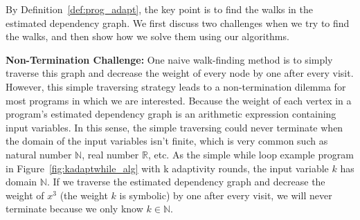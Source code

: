 By Definition~\ref{def:prog_adapt}, the key point is to find the walks in the estimated dependency graph. 
We first discuss two challenges when we try to find the walks,
and then show how we solve them using our algorithms.

\textbf{Non-Termination Challenge:}
One naive walk-finding method is to simply traverse this graph and decrease the weight of every node by one after every visit. However, this simple 
traversing strategy leads to a non-termination dilemma for most programs in which we are interested. 
Because the weight of each vertex in a program's estimated dependency graph is an arithmetic expression containing input variables. 
In this sense, the simple traversing could never terminate when the domain of the input variables isn't finite,
which is very common such as natural number $\mathbb{N}$, real number $\mathbb{R}$, etc. 
As the simple while loop example program in Figure~\ref{fig:kadaptwhile_alg} with k adaptivity rounds, the input variable $k$ has domain $\mathbb{N}$.
If we traverse the estimated dependency graph and decrease the weight of $x^3$ (the weight $k$ is symbolic) by one after every visit,
we will never terminate because we only know $k \in \mathbb{N}$.



